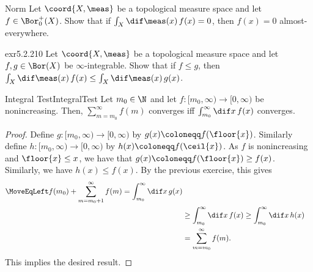 \begin{exr}{}{Norm}
Let $\coord{X,\meas}$ be a topological measure space and let $f\in \Bor _0^+(X)$.  Show that if $\int _X\dif \meas (x)\, f(x)=0$, then $f(x)=0$ almost-everywhere.
\end{exr}
\begin{exr}{}{exr5.2.210}
Let $\coord{X,\meas}$ be a topological measure space and let $f,g\in \Bor (X)$ be $\infty$-integrable.  Show that if $f\leq g$, then $\int _X\dif \meas (x)\, f(x)\leq \int _X\dif \meas (x)\, g(x)$.
\end{exr}
\begin{prp}{Integral Test}{IntegralTest}
Let $m_0\in \N$ and let $f\colon [m_0,\infty )\rightarrow  [0,\infty )$ be nonincreasing.  Then, $\sum _{m=m_0}^{\infty}f(m)$ converges iff $\int _{m_0}^{\infty}\dif x\, f(x)$ converges.
\begin{proof}
Define $g\colon [m_0,\infty )\rightarrow [0,\infty )$ by $g(x)\coloneqq f(\floor{x})$.  Similarly define $h\colon [m_0,\infty )\rightarrow [0,\infty )$ by $h(x)\coloneqq f(\ceil{x})$.  As $f$ is nonincreasing and $\floor{x}\leq x$, we have that $g(x)\coloneqq f(\floor{x})\geq f(x)$.  Similarly, we have $h(x)\leq f(x)$.  By the previous exercise, this gives
\begin{equation}
\begin{split}
\MoveEqLeft
f(m_0)+\sum _{m=m_0+1}^{\infty}f(m)=\int _{m_0}^{\infty}\dif x\, g(x) \\
& \geq \int _{m_0}^{\infty}\dif x\, f(x)\geq \int _{m_0}^{\infty}\dif x\, h(x) \\
& =\sum _{m=m_0}^{\infty}f(m).
\end{split}
\end{equation}
This implies the desired result.
\end{proof}
\end{prp}

